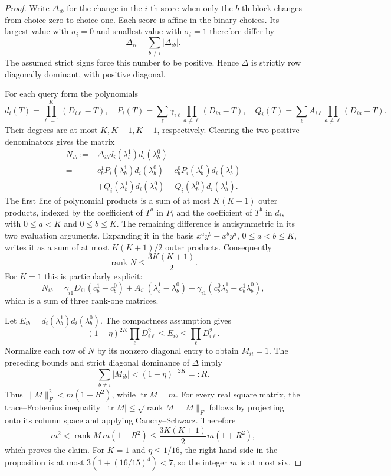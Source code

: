 \documentclass[11pt]{article}
\begin{document}
\begin{proof}
Write $\Delta_{ib}$ for the change in the $i$-th score when only the
$b$-th block changes from choice zero to choice one. Each score is
affine in the binary choices. Its largest value with $\sigma_i=0$
and smallest value with $\sigma_i=1$ therefore differ by
\[
 \Delta_{ii}-\sum_{b\ne i}|\Delta_{ib}|.
\]
The assumed strict signs force this number to be positive. Hence
$\Delta$ is strictly row diagonally dominant, with positive diagonal.

For each query form the polynomials
\[
 d_i(T)=\prod_{\ell=1}^K(D_{i\ell}-T),\quad
 P_i(T)=\sum_\ell\gamma_{i\ell}
                \prod_{a\ne\ell}(D_{ia}-T),\quad
 Q_i(T)=\sum_\ell A_{i\ell}
                \prod_{a\ne\ell}(D_{ia}-T).
\]
Their degrees are at most $K,K-1,K-1$, respectively. Clearing the
two positive denominators gives the matrix
\[
\begin{split}
 N_{ib}:={}&\Delta_{ib}d_i(\lambda_b^1)d_i(\lambda_b^0)\\
 ={}&c_b^1P_i(\lambda_b^1)d_i(\lambda_b^0)
       -c_b^0P_i(\lambda_b^0)d_i(\lambda_b^1)\\
 &+Q_i(\lambda_b^1)d_i(\lambda_b^0)
       -Q_i(\lambda_b^0)d_i(\lambda_b^1).
\end{split}
\]
The first line of polynomial products is a sum of at most $K(K+1)$
outer products, indexed by the coefficient of $T^a$ in $P_i$ and
the coefficient of $T^b$ in $d_i$, with $0\leq a<K$ and $0\leq b\leq K$.
The remaining difference is antisymmetric in its two evaluation
arguments. Expanding it in the basis
$x^ay^b-x^by^a$, $0\leq a<b\leq K$, writes it as a sum of at most
$K(K+1)/2$ outer products. Consequently
\[
 \operatorname{rank}N\leq\frac{3K(K+1)}2.
\]
For $K=1$ this is particularly explicit:
\[
 N_{ib}=\gamma_{i1}D_{i1}(c_b^1-c_b^0)
       +A_{i1}(\lambda_b^1-\lambda_b^0)
       +\gamma_{i1}(c_b^0\lambda_b^1-c_b^1\lambda_b^0),
\]
which is a sum of three rank-one matrices.

Let $E_{ib}=d_i(\lambda_b^1)d_i(\lambda_b^0)$.
The compactness assumption gives
\[
 (1-\eta)^{2K}\prod_\ell D_{i\ell}^{2}
 \leq E_{ib}\leq\prod_\ell D_{i\ell}^{2}.
\]
Normalize each row of $N$ by its nonzero diagonal entry to obtain
$M_{ii}=1$. The preceding bounds and strict diagonal dominance of
$\Delta$ imply
\[
 \sum_{b\ne i}|M_{ib}|<(1-\eta)^{-2K}=:R.
\]
Thus $\|M\|_F^2<m(1+R^2)$, while $\operatorname{tr}M=m$.
For every real square matrix, the trace--Frobenius inequality
$|\operatorname{tr}M|\leq
\sqrt{\operatorname{rank}M}\,\|M\|_F$
follows by projecting onto its column space and applying
Cauchy--Schwarz. Therefore
\[
 m^2<\operatorname{rank}M\,m(1+R^2)
 \leq \frac{3K(K+1)}2m(1+R^2),
\]
which proves the claim. For $K=1$ and $\eta\leq1/16$, the right-hand
side in the proposition is at most
$3(1+(16/15)^4)<7$, so the integer $m$ is at most six.
\end{proof}
\end{document}
